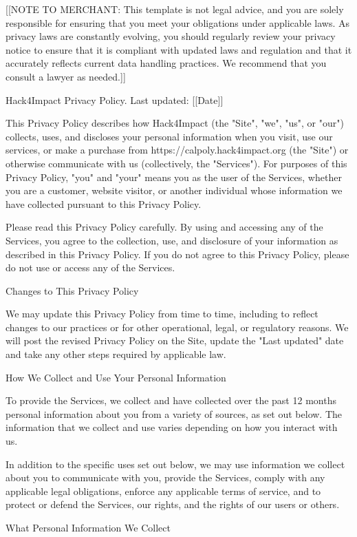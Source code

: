 \documentclass[conference]{IEEEtran}
\begin{document}
[[NOTE TO MERCHANT: This template is not legal advice, and you are solely responsible for ensuring that you meet your obligations under applicable laws. As privacy laws are constantly evolving, you should regularly review your privacy notice to ensure that it is compliant with updated laws and regulation and that it accurately reflects current data handling practices. We recommend that you consult a lawyer as needed.]]

Hack4Impact Privacy Policy.
Last updated: [[Date]]

This Privacy Policy describes how Hack4Impact (the "Site", "we", "us", or "our") collects, uses, and discloses your personal information when you visit, use our services, or make a purchase from https://calpoly.hack4impact.org (the "Site") or otherwise communicate with us (collectively, the "Services"). For purposes of this Privacy Policy, "you" and "your" means you as the user of the Services, whether you are a customer, website visitor, or another individual whose information we have collected pursuant to this Privacy Policy.

Please read this Privacy Policy carefully. By using and accessing any of the Services, you agree to the collection, use, and disclosure of your information as described in this Privacy Policy. If you do not agree to this Privacy Policy, please do not use or access any of the Services.

Changes to This Privacy Policy

We may update this Privacy Policy from time to time, including to reflect changes to our practices or for other operational, legal, or regulatory reasons. We will post the revised Privacy Policy on the Site, update the "Last updated" date and take any other steps required by applicable law.

How We Collect and Use Your Personal Information

To provide the Services, we collect and have collected over the past 12 months personal information about you from a variety of sources, as set out below. The information that we collect and use varies depending on how you interact with us.

In addition to the specific uses set out below, we may use information we collect about you to communicate with you, provide the Services, comply with any applicable legal obligations, enforce any applicable terms of service, and to protect or defend the Services, our rights, and the rights of our users or others.

What Personal Information We Collect
\end{document}
